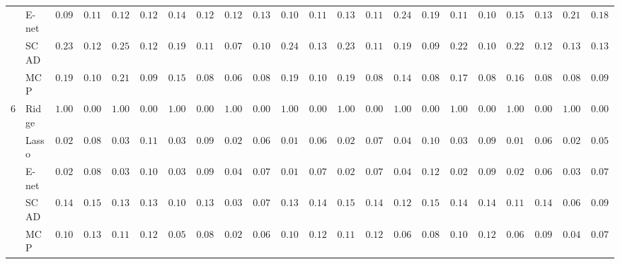 \begin{tabular}{ll|ll|llllll|llllll|llllll}
 & E-net  & $0.0950$ & $0.1142$ & $0.1233$ & $0.1222$ & $0.1433$ & $0.1254$ & $0.1283$ & $0.1316$ & $0.1017$ & $0.1182$ & $0.1350$ & $0.1129$ & $0.2417$ & $0.1959$ & $0.1167$ & $0.1046$ & $0.1500$ & $0.1391$ & $0.2150$ & $0.1824$ \\
 & SCAD  & $0.2383$ & $0.1214$ & $0.2550$ & $0.1264$ & $0.1983$ & $0.1103$ & $0.0733$ & $0.1014$ & $0.2433$ & $0.1369$ & $0.2383$ & $0.1142$ & $0.1967$ & $0.0988$ & $0.2233$ & $0.1091$ & $0.2250$ & $0.1239$ & $0.1300$ & $0.1352$ \\
 & MCP  & $0.1917$ & $0.1069$ & $0.2117$ & $0.0973$ & $0.1567$ & $0.0881$ & $0.0633$ & $0.0847$ & $0.1917$ & $0.1043$ & $0.1933$ & $0.0811$ & $0.1483$ & $0.0883$ & $0.1783$ & $0.0829$ & $0.1683$ & $0.0870$ & $0.0883$ & $0.0931$ \\\hline
6 & Ridge  & $1.0000$ & $0.0000$ & $1.0000$ & $0.0000$ & $1.0000$ & $0.0000$ & $1.0000$ & $0.0000$ & $1.0000$ & $0.0000$ & $1.0000$ & $0.0000$ & $1.0000$ & $0.0000$ & $1.0000$ & $0.0000$ & $1.0000$ & $0.0000$ & $1.0000$ & $0.0000$ \\
 & Lasso  & $0.0250$ & $0.0833$ & $0.0333$ & $0.1111$ & $0.0350$ & $0.0956$ & $0.0267$ & $0.0614$ & $0.0150$ & $0.0631$ & $0.0267$ & $0.0739$ & $0.0417$ & $0.1069$ & $0.0300$ & $0.0959$ & $0.0183$ & $0.0622$ & $0.0233$ & $0.0581$ \\
 & E-net  & $0.0250$ & $0.0833$ & $0.0333$ & $0.1033$ & $0.0367$ & $0.0993$ & $0.0400$ & $0.0790$ & $0.0183$ & $0.0707$ & $0.0267$ & $0.0776$ & $0.0467$ & $0.1233$ & $0.0283$ & $0.0949$ & $0.0200$ & $0.0682$ & $0.0367$ & $0.0771$ \\
 & SCAD  & $0.1400$ & $0.1548$ & $0.1350$ & $0.1334$ & $0.1033$ & $0.1356$ & $0.0350$ & $0.0760$ & $0.1333$ & $0.1460$ & $0.1517$ & $0.1462$ & $0.1250$ & $0.1542$ & $0.1417$ & $0.1448$ & $0.1183$ & $0.1407$ & $0.0633$ & $0.0941$ \\
 & MCP  & $0.1017$ & $0.1338$ & $0.1100$ & $0.1258$ & $0.0567$ & $0.0893$ & $0.0267$ & $0.0658$ & $0.1017$ & $0.1229$ & $0.1133$ & $0.1205$ & $0.0617$ & $0.0875$ & $0.1050$ & $0.1200$ & $0.0617$ & $0.0937$ & $0.0483$ & $0.0796$ \\
\hline 
\end{tabular}

